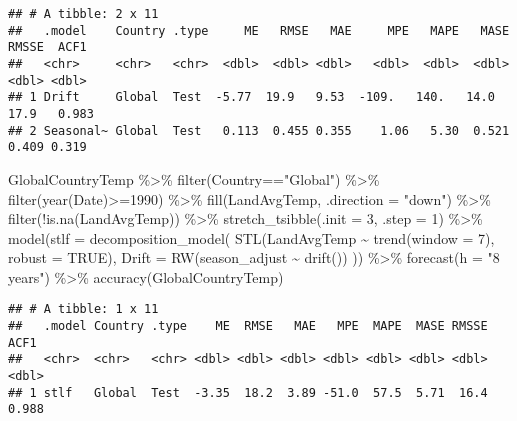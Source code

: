 \documentclass[
]{article}
\newenvironment{Shaded}{\begin{snugshade}}{\end{snugshade}}
\newcommand{\AttributeTok}[1]{\textcolor[rgb]{0.77,0.63,0.00}{#1}}
\newcommand{\ConstantTok}[1]{\textcolor[rgb]{0.00,0.00,0.00}{#1}}
\newcommand{\DecValTok}[1]{\textcolor[rgb]{0.00,0.00,0.81}{#1}}
\newcommand{\FunctionTok}[1]{\textcolor[rgb]{0.00,0.00,0.00}{#1}}
\newcommand{\NormalTok}[1]{#1}
\newcommand{\SpecialCharTok}[1]{\textcolor[rgb]{0.00,0.00,0.00}{#1}}
\newcommand{\StringTok}[1]{\textcolor[rgb]{0.31,0.60,0.02}{#1}}
\begin{document}
\begin{verbatim}
## # A tibble: 2 x 11
##   .model    Country .type     ME   RMSE   MAE     MPE   MAPE   MASE  RMSSE  ACF1
##   <chr>     <chr>   <chr>  <dbl>  <dbl> <dbl>   <dbl>  <dbl>  <dbl>  <dbl> <dbl>
## 1 Drift     Global  Test  -5.77  19.9   9.53  -109.   140.   14.0   17.9   0.983
## 2 Seasonal~ Global  Test   0.113  0.455 0.355    1.06   5.30  0.521  0.409 0.319
\end{verbatim}

\begin{Shaded}
\begin{Highlighting}[]
\NormalTok{GlobalCountryTemp }\SpecialCharTok{\%\textgreater{}\%} 
  \FunctionTok{filter}\NormalTok{(Country}\SpecialCharTok{==}\StringTok{"Global"}\NormalTok{) }\SpecialCharTok{\%\textgreater{}\%} 
  \FunctionTok{filter}\NormalTok{(}\FunctionTok{year}\NormalTok{(Date)}\SpecialCharTok{\textgreater{}=}\DecValTok{1990}\NormalTok{) }\SpecialCharTok{\%\textgreater{}\%}
  \FunctionTok{fill}\NormalTok{(LandAvgTemp, }\AttributeTok{.direction =} \StringTok{"down"}\NormalTok{) }\SpecialCharTok{\%\textgreater{}\%}
  \FunctionTok{filter}\NormalTok{(}\SpecialCharTok{!}\FunctionTok{is.na}\NormalTok{(LandAvgTemp)) }\SpecialCharTok{\%\textgreater{}\%}
  \FunctionTok{stretch\_tsibble}\NormalTok{(}\AttributeTok{.init =} \DecValTok{3}\NormalTok{, }\AttributeTok{.step =} \DecValTok{1}\NormalTok{) }\SpecialCharTok{\%\textgreater{}\%}
  \FunctionTok{model}\NormalTok{(}\AttributeTok{stlf =} \FunctionTok{decomposition\_model}\NormalTok{(}
    \FunctionTok{STL}\NormalTok{(LandAvgTemp }\SpecialCharTok{\textasciitilde{}} \FunctionTok{trend}\NormalTok{(}\AttributeTok{window =} \DecValTok{7}\NormalTok{), }\AttributeTok{robust =} \ConstantTok{TRUE}\NormalTok{),}
        \AttributeTok{Drift =} \FunctionTok{RW}\NormalTok{(season\_adjust }\SpecialCharTok{\textasciitilde{}} \FunctionTok{drift}\NormalTok{())}
\NormalTok{    )) }\SpecialCharTok{\%\textgreater{}\%} \FunctionTok{forecast}\NormalTok{(}\AttributeTok{h =} \StringTok{"8 years"}\NormalTok{) }\SpecialCharTok{\%\textgreater{}\%} 
  \FunctionTok{accuracy}\NormalTok{(GlobalCountryTemp)}
\end{Highlighting}
\end{Shaded}

\begin{verbatim}
## # A tibble: 1 x 11
##   .model Country .type    ME  RMSE   MAE   MPE  MAPE  MASE RMSSE  ACF1
##   <chr>  <chr>   <chr> <dbl> <dbl> <dbl> <dbl> <dbl> <dbl> <dbl> <dbl>
## 1 stlf   Global  Test  -3.35  18.2  3.89 -51.0  57.5  5.71  16.4 0.988
\end{verbatim}
\end{document}
